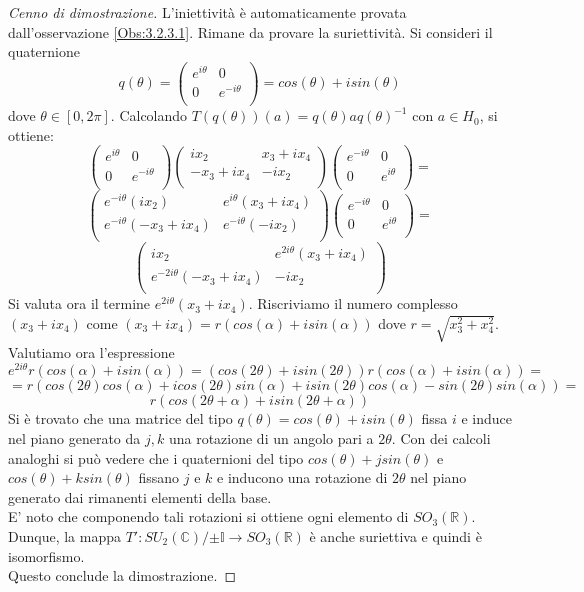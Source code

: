 \documentclass[12pt,a4paper]{report}
\theoremstyle{definition}
\theoremstyle{Theorem}
\theoremstyle{definition}
\theoremstyle{definition}
\theoremstyle{definition}
\begin{document}
\begin{proof} [Cenno di dimostrazione]
	L'iniettività è automaticamente provata dall'osservazione \ref{Obs:3.2.3.1}. Rimane da provare la suriettività.
	Si consideri il quaternione 
	$$q(\theta)=
	\begin{pmatrix}
		e^{i\theta} & 0\\
		0 & e^{-i\theta}\\
	\end{pmatrix}=cos(\theta)+isin(\theta)$$
dove $\theta\in [0,2\pi]$. Calcolando $T(q(\theta))(a)=q(\theta)aq(\theta)^{-1}$ con $a\in H_0$, si ottiene:
$$\begin{pmatrix}
	e^{i\theta} & 0\\
	0 & e^{-i\theta}\\
\end{pmatrix}
\begin{pmatrix}
	ix_2 & x_3+ix_4\\
	-x_3+ix_4 & -ix_2\\
\end{pmatrix}
\begin{pmatrix}
e^{-i\theta} & 0\\
0 & e^{i\theta}\\
\end{pmatrix}=$$
$$\begin{pmatrix}
	e^{-i\theta}(ix_2) & e^{i\theta}(x_3+ix_4)\\
	e^{-i\theta}(-x_3+ix_4) & e^{-i\theta}(-ix_2)\\
\end{pmatrix}
\begin{pmatrix}
	e^{-i\theta} & 0\\
	0 & e^{i\theta}\\
\end{pmatrix}=$$
$$\begin{pmatrix}
	ix_2 & e^{2i\theta}(x_3+ix_4)\\
	e^{-2i\theta}(-x_3+ix_4) & -ix_2\\
\end{pmatrix}$$
Si valuta ora il termine $e^{2i\theta}(x_3+ix_4)$. Riscriviamo il numero complesso $(x_3+ix_4)$ come $(x_3+ix_4)=r(cos(\alpha)+isin(\alpha))$ dove $r=\sqrt{x_3^2+x_4^2}$. Valutiamo ora l'espressione 
$$e^{2i\theta}r(cos(\alpha)+isin(\alpha))=
(cos(2\theta)+isin(2\theta))r(cos(\alpha)+isin(\alpha))=$$
$$=r(cos(2\theta)cos(\alpha)+icos(2\theta)sin(\alpha)+isin(2\theta)cos(\alpha)-sin(2\theta)sin(\alpha))=$$
$$r(cos(2\theta+\alpha)+isin(2\theta+\alpha))$$
Si è trovato che una matrice del tipo $q(\theta)=cos(\theta)+isin(\theta)$ fissa $i$ e induce nel piano generato da $j,k$ una rotazione di un angolo pari a $2\theta$. Con dei calcoli analoghi si può vedere che i quaternioni del tipo $cos(\theta)+jsin(\theta)$ e $cos(\theta)+ksin(\theta)$ fissano $j$ e $k$ e inducono una rotazione di $2\theta$ nel piano generato dai rimanenti elementi della base.\\
E' noto che componendo tali rotazioni si ottiene ogni elemento di $SO_3(\mathbb{R})$. Dunque, la mappa $T':SU_2(\mathbb{C})/{\pm \mathbb{I}}\longrightarrow SO_3(\mathbb{R})$ è anche suriettiva e quindi è isomorfismo.\\
Questo conclude la dimostrazione.
\end{proof}
\end{document}
